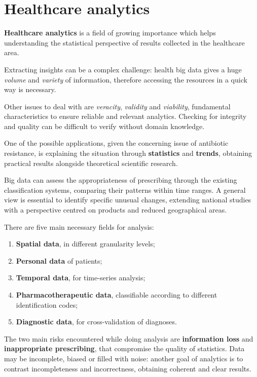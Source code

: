 \section{Healthcare analytics}
\textbf{Healthcare analytics} is a field of growing importance which helps understanding the statistical perspective of results collected in the healthcare area. 

Extracting insights can be a complex challenge: health big data gives a huge \textit{volume} and \textit{variety} of information, therefore accessing the resources in a quick way is necessary. 

Other issues to deal with are \textit{veracity}, \textit{validity} and \textit{viability}, fundamental characteristics to ensure reliable and relevant analytics. Checking for integrity and quality can be difficult to verify without domain knowledge\cite{4vs}.

One of the possible applications, given the concerning issue of antibiotic resistance, is explaining the situation through \textbf{statistics} and \textbf{trends}, obtaining practical results alongside theoretical scientific research. 

Big data can assess the appropriateness of prescribing through the existing classification systems, comparing their patterns within time ranges. A general view is essential to identify specific unusual changes, extending national studies with a perspective centred on products and reduced geographical areas.

There are five main necessary fields for analysis:
\begin{enumerate}
	\item \textbf{Spatial data}, in different granularity levels;
	\item \textbf{Personal data} of patients;
	\item \textbf{Temporal data}, for time-series analysis;
	\item \textbf{Pharmacotherapeutic data}, classifiable according to different identification codes;
	\item \textbf{Diagnostic data}, for cross-validation of diagnoses.
\end{enumerate}

The two main risks encountered while doing analysis are \textbf{information loss} and \textbf{inappropriate prescribing}, that compromise the quality of statistics. Data may be incomplete, biased or filled with noise: another goal of analytics is to contrast incompleteness and incorrectness, obtaining coherent and clear results.
